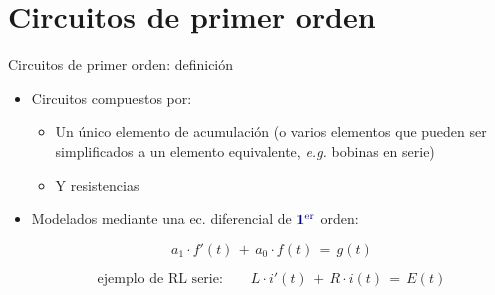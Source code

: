 \documentclass[aspectratio=169, usenames,svgnames,dvipsnames]{beamer}
\begin{document}



\section{Circuitos de primer orden}

\begin{frame}{Circuitos de primer orden: \hspace{3mm}definición}
    \vspace{3mm}
    \begin{itemize}
        \item Circuitos compuestos por:
        \vspace{2mm}
        \begin{itemize}
            \normalsize
            \item Un \alert{único elemento de acumulación} (o varios elementos que pueden ser simplificados a un elemento equivalente, \textit{e.g.} bobinas en serie) 

            \vspace{2mm}
            \item Y \alert{resistencias}
        \end{itemize}
        
        \vspace{5mm}
        \item Modelados mediante una \alert{ec. diferencial de} ${\boldsymbol{\color{blue!50!black} 1^{\textrm{er}}}}$ \alert{orden}:   

        \vspace{1mm}
        \begin{equation*}
           \boxed{\; a_1\cdot f'(t) \,+\, a_0\cdot f(t) \,=\, g(t) \;}
        \end{equation*}
        
        \begin{equation*}
            \textrm{ejemplo de RL serie:} \qquad L\cdot i'(t) \,+\, R\cdot i(t) \,=\, E(t)
        \end{equation*}
    \end{itemize}
\end{frame}
\end{document}

